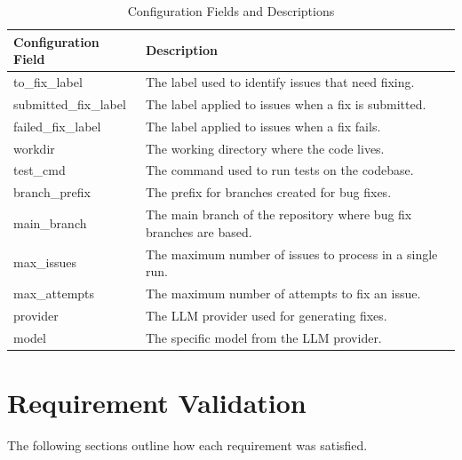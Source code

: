 \renewcommand{\arraystretch}{1.5}
\begin{longtable}{@{\extracolsep{\fill}} p{3.5cm} | p{11cm} @{}}
    \caption{Configuration Fields and Descriptions} \label{table:configuration}                        \\
    \toprule
    \textbf{Configuration Field} & \textbf{Description}                                                \\
    \midrule
    \endfirsthead

    \bottomrule
    \endfoot

    to\_fix\_label               & The label used to identify issues that need fixing.                 \\ \hline
    submitted\_fix\_label        & The label applied to issues when a fix is submitted.                \\ \hline
    failed\_fix\_label           & The label applied to issues when a fix fails.                       \\ \hline
    workdir                      & The working directory where the code lives.                         \\ \hline
    test\_cmd                    & The command used to run tests on the codebase.                      \\ \hline
    branch\_prefix               & The prefix for branches created for bug fixes.                      \\ \hline
    main\_branch                 & The main branch of the repository where bug fix branches are based. \\ \hline
    max\_issues                  & The maximum number of issues to process in a single run.            \\ \hline
    max\_attempts                & The maximum number of attempts to fix an issue.                     \\ \hline
    provider                     & The LLM provider used for generating fixes.                         \\ \hline
    model                        & The specific model from the LLM provider.                           \\
\end{longtable}



\section{Requirement Validation}

The following sections outline how each requirement was satisfied.

